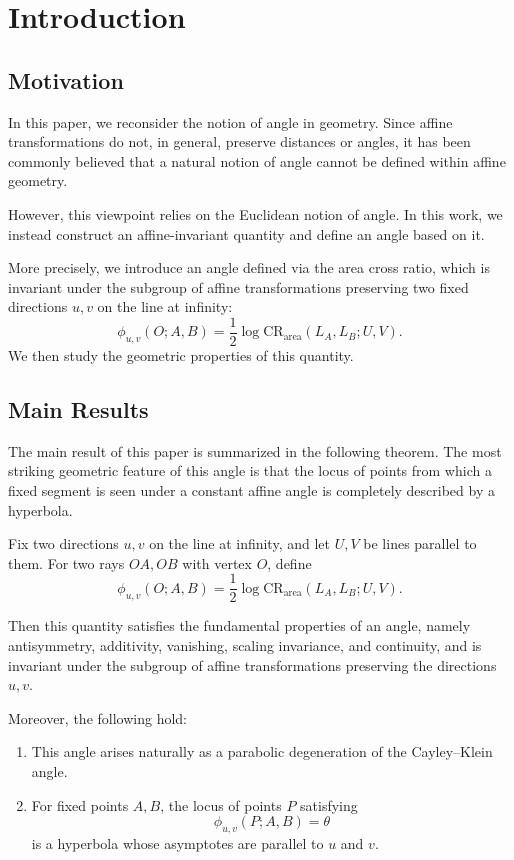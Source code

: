 \documentclass[12pt]{article}
\begin{document}
\section{Introduction}

\subsection{Motivation}

In this paper, we reconsider the notion of angle in geometry.
Since affine transformations do not, in general, preserve distances or angles,
it has been commonly believed that a natural notion of angle cannot be defined
within affine geometry.

However, this viewpoint relies on the Euclidean notion of angle.
In this work, we instead construct an affine-invariant quantity
and define an angle based on it.

More precisely, we introduce an angle defined via the area cross ratio,
which is invariant under the subgroup of affine transformations preserving
two fixed directions $u,v$ on the line at infinity:
\[
\phi_{u,v}(O;A,B)
=
\frac{1}{2}\log \mathrm{CR}_{\mathrm{area}}(L_A,L_B;U,V).
\]
We then study the geometric properties of this quantity.

\subsection{Main Results}

The main result of this paper is summarized in the following theorem.
The most striking geometric feature of this angle is that
the locus of points from which a fixed segment is seen under a constant affine angle
is completely described by a hyperbola.

\begin{maintheorem}
Fix two directions $u,v$ on the line at infinity,
and let $U,V$ be lines parallel to them.
For two rays $OA, OB$ with vertex $O$, define
\[
\phi_{u,v}(O;A,B)
=
\frac{1}{2}\log \mathrm{CR}_{\mathrm{area}}(L_A,L_B;U,V).
\]

Then this quantity satisfies the fundamental properties of an angle,
namely antisymmetry, additivity, vanishing, scaling invariance,
and continuity, and is invariant under the subgroup of affine transformations
preserving the directions $u,v$.

Moreover, the following hold:
\begin{enumerate}
\item This angle arises naturally as a parabolic degeneration of the Cayley--Klein angle.
\item For fixed points $A,B$, the locus of points $P$ satisfying
\[
\phi_{u,v}(P;A,B)=\theta
\]
is a hyperbola whose asymptotes are parallel to $u$ and $v$.
\end{enumerate}
\end{maintheorem}
\end{document}
